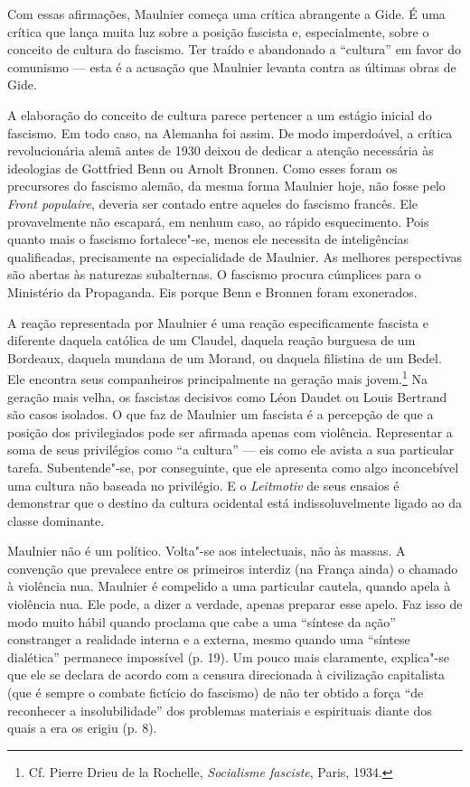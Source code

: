Com essas afirmações, Maulnier começa uma crítica abrangente a Gide. É
uma crítica que lança muita luz sobre a posição fascista e,
especialmente, sobre o conceito de cultura do fascismo. Ter traído e
abandonado a ``cultura'' em favor do comunismo --- esta é a acusação que
Maulnier levanta contra as últimas obras de Gide.

A elaboração do conceito de cultura parece pertencer a um estágio
inicial do fascismo. Em todo caso, na Alemanha foi assim. De modo
imperdoável, a crítica revolucionária alemã antes de 1930 deixou de
dedicar a atenção necessária às ideologias de Gottfried Benn ou Arnolt
Bronnen. Como esses foram os precursores do fascismo alemão, da mesma
forma Maulnier hoje, não fosse pelo \emph{Front populaire}, deveria ser
contado entre aqueles do fascismo francês. Ele provavelmente não
escapará, em nenhum caso, ao rápido esquecimento. Pois quanto mais o
fascismo fortalece"-se, menos ele necessita de inteligências
qualificadas, precisamente na especialidade de Maulnier. As melhores
perspectivas são abertas às naturezas subalternas. O fascismo procura
cúmplices para o Ministério da Propaganda. Eis porque Benn e Bronnen
foram exonerados.

A reação representada por Maulnier é uma reação especificamente fascista
e diferente daquela católica de um Claudel, daquela reação burguesa de
um Bordeaux, daquela mundana de um Morand, ou daquela filistina de um
Bedel. Ele encontra seus companheiros principalmente na geração mais
jovem.\footnote{Cf. Pierre Drieu de la Rochelle, \emph{Socialisme
  fasciste}, Paris, 1934. \versal{[N. A.]}} Na geração mais velha, os fascistas
decisivos como Léon Daudet ou Louis Bertrand são casos isolados. O que
faz de Maulnier um fascista é a percepção de que a posição dos
privilegiados pode ser afirmada apenas com violência. Representar a soma
de seus privilégios como ``a cultura'' --- eis como ele avista a sua
particular tarefa. Subentende"-se, por conseguinte, que ele apresenta
como algo inconcebível uma cultura não baseada no privilégio. E o
\emph{Leitmotiv} de seus ensaios é demonstrar que o destino da cultura
ocidental está indissoluvelmente ligado ao da classe dominante.

Maulnier não é um político. Volta"-se aos intelectuais, não às massas. A
convenção que prevalece entre os primeiros interdiz (na França ainda) o
chamado à violência nua. Maulnier é compelido a uma particular cautela,
quando apela à violência nua. Ele pode, a dizer a verdade, apenas
preparar esse apelo. Faz isso de modo muito hábil quando proclama que
cabe a uma ``síntese da ação'' constranger a realidade interna e a
externa, mesmo quando uma ``síntese dialética'' permanece impossível (p.
19). Um pouco mais claramente, explica"-se que ele se declara de acordo
com a censura direcionada à civilização capitalista (que é sempre o
combate fictício do fascismo) de não ter obtido a força ``de reconhecer
a insolubilidade'' dos problemas materiais e espirituais diante dos
quais a era os erigiu (p. 8).

